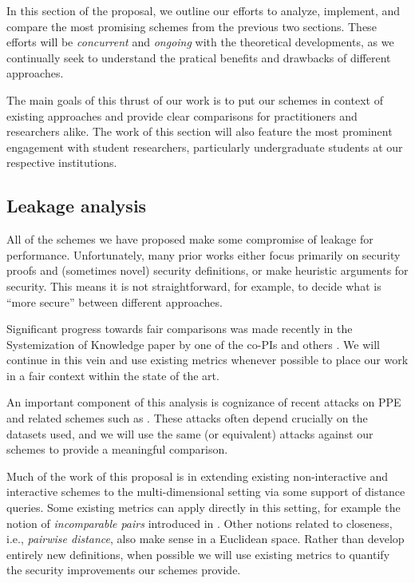 
In this section of the proposal, we outline our efforts to analyze,
implement, and compare the most promising schemes from the previous two
sections. These efforts will be \emph{concurrent} and \emph{ongoing}
with the theoretical developments, as we continually seek to understand
the pratical benefits and drawbacks of different approaches.

The main goals of this thrust of our work is to put our schemes in
context of existing approaches and provide clear comparisons for
practitioners and researchers alike.
The work of this section will also feature the most prominent engagement
with student researchers, particularly
undergraduate students at our respective institutions.

\subsection{Leakage analysis}

All of the schemes we have proposed make some compromise of leakage for
performance. Unfortunately, many prior works either focus primarily on security
proofs and (sometimes novel) security definitions, or make heuristic
arguments for security. This means it is not
straightforward, for example, to decide what is ``more secure'' between
different approaches.

Significant progress towards fair comparisons was made recently in the
Systemization of Knowledge paper by one of the co-PIs and others
\cite{SP:FVYSHG17}. We will continue in this vein and use existing
metrics whenever possible to place our work in a fair context within the
state of the art.

An important component of this analysis is cognizance of
recent attacks on PPE and related schemes such as
\cite{CCS:CGPR15,CCS:KKNO16}. These attacks often depend crucially on
the datasets used, and we will use the same (or equivalent) attacks
against our schemes to provide a meaningful comparison.

Much of the work of this proposal is in extending existing
non-interactive and interactive schemes to the multi-dimensional setting
via some support of distance queries. Some existing metrics can apply
directly in this setting, for example the notion of \emph{incomparable
pairs} introduced in \cite{CCS:RACY16}. Other notions related to
closeness, i.e., \emph{pairwise distance}, also make sense in a
Euclidean space. Rather than develop entirely new definitions, when
possible we will use existing metrics to quantify the security
improvements our schemes provide.

